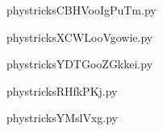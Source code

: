     

    \clearpage
    


    \newcommand{\CaptionFigCBHVooIgPuTm}{<+Type your caption here+>}
    \begin{center}
        
    \end{center}
    phystricksCBHVooIgPuTm.py

    

    \clearpage
    


    \newcommand{\CaptionFigXCWLooVgowie}{<+Type your caption here+>}
    \begin{center}
        
    \end{center}
    phystricksXCWLooVgowie.py

    

    \clearpage
    


    \newcommand{\CaptionFigYDTGooZGkkei}{<+Type your caption here+>}
    \begin{center}
        
    \end{center}
    phystricksYDTGooZGkkei.py

    

    \clearpage
    


    \newcommand{\CaptionFigRHfkPKj}{<+Type your caption here+>}
    \begin{center}
        
    \end{center}
    phystricksRHfkPKj.py

    

    \clearpage
    


    \newcommand{\CaptionFigYMslVxg}{<+Type your caption here+>}
    \begin{center}
        
    \end{center}
    phystricksYMslVxg.py

    

    \clearpage
    


